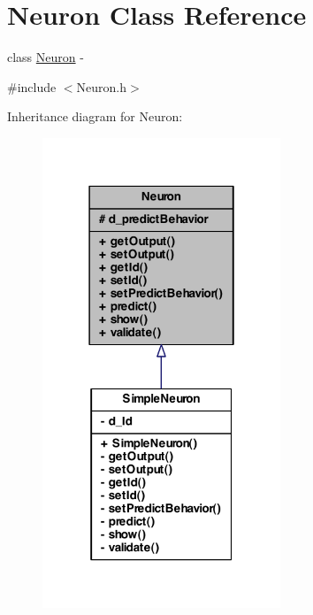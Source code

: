 \hypertarget{class_neuron}{
\section{Neuron Class Reference}
\label{class_neuron}
}


class \hyperlink{class_neuron}{Neuron} -\/  




{\ttfamily \#include $<$Neuron.h$>$}



Inheritance diagram for Neuron:
\nopagebreak
\begin{figure}[H]
\begin{center}
\leavevmode
\includegraphics[width=202pt]{class_neuron__inherit__graph}
\end{center}
\end{figure}
